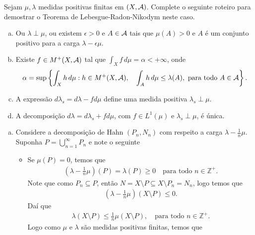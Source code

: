 \begin{homeworkProblem}[6]
  Sejam $\mu,\lambda$ medidas positivas finitas em $(X,\mathcal{A})$. Complete o seguinte roteiro para demostrar o Teorema de Lebesgue-Radon-Nikodym neste caso.
  \begin{enumerate}[a)]
    \item Ou $\lambda\perp\mu$, ou existem $\epsilon>0$ e $A\in\mathcal{A}$ tais que $\mu(A)>0$ e $A$ é um conjunto positivo para a carga $\lambda-\epsilon\mu$.
    \item Existe $f\in M^{+}(X,\mathcal{A})$ tal que $\int_{X}f\,d\mu=\alpha<+\infty$, onde
    \begin{align*}
      \alpha=\sup\left\{ \int_{X}h\,d\mu:h\in M^{+}(X,\mathcal{A}),\quad \int_{A}h\,d\mu\leq\lambda(A),\text{ para todo }A\in\mathcal{A} \right\}.
    \end{align*}
    \item A expressão $d\lambda_s=d\lambda-fd\mu$ define uma medida positiva $\lambda_s\perp\mu$.
    \item A decomposição $d\lambda=d\lambda_s+fd\mu$, com $f\in L^{1}(\mu)$ e $\lambda_s\perp\mu$, é única. 
  \end{enumerate}
  \begin{solution}
  \begin{enumerate}[a)]
    \item Considere a decomposição de Hahn $(P_n,N_n)$ com respeito a carga $\lambda-\frac{1}{n}\mu$.\\
      Suponha $P=\bigcup_{n=1}^{\infty}P_n$ e note o seguinte
      \begin{itemize}
        \item Se $\mu(P)=0$, temos que 
          \begin{align*}
            \left( \lambda-\frac{1}{n}\mu \right)(P)=\lambda(P)\geq 0\quad\text{para todo }n\in\mathbb{Z}^{+}.
          \end{align*}
          Note que como $P_n\subseteq P$, então $N=X\setminus P\subseteq X\setminus P_n=N_n$, logo temos que
          \begin{align*}
            \left( \lambda-\frac{1}{n}\mu \right)(X\setminus P)\leq 0.
          \end{align*}
          Daí que
          \begin{align*}
            \lambda(X\setminus P)\leq \frac{1}{n}\mu(X\setminus P),\quad\text{para todo }n\in\mathbb{Z}^{+}.
          \end{align*}
          Logo como $\mu$ e $\lambda$ são medidas positivas finitas, temos que

\end{itemize}
\end{enumerate}
\end{solution}
\end{homeworkProblem}
